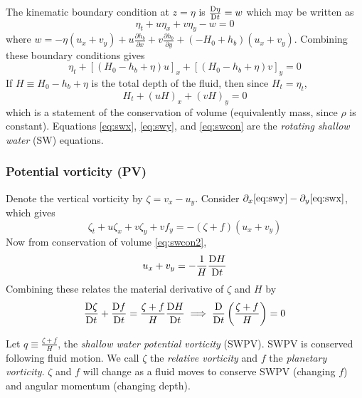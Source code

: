 \documentclass{jknotes}
\begin{document}
The kinematic boundary condition at $z = \eta$ is $\frac{\mathrm{D} \eta}{\mathrm{D}
t} = w$ which may be written as
\begin{equation}
	\eta_t + u \eta_x + v \eta_y - w = 0
\end{equation}
where $w = -\eta(u_x+v_y) + u \frac{\partial h_b}{\partial x} + v
\frac{\partial h_b}{\partial y} + (-H_0 + h_b)(u_x+v_y)$. Combining these
boundary conditions gives
\begin{equation}
	\eta_t + \left[ (H_0-h_b+\eta)u\right]_x + \left[ (H_0-h_b+\eta)v\right]_y
	= 0 \label{eq:swcon}
\end{equation}
If $H \equiv H_0 - h_b + \eta$ is the total depth of the fluid, then since
$H_t = \eta_t$,
\begin{equation}
	H_t + (uH)_x + (vH)_y = 0 \label{eq:swcon2}
\end{equation}
which is a statement of the conservation of volume (equivalently mass, since
$\rho$ is constant). Equations \eqref{eq:swx}, \eqref{eq:swy}, and
\eqref{eq:swcon} are the \emph{rotating shallow water} (SW) equations.

\subsubsection{Potential vorticity (PV)}
Denote the vertical vorticity by $\zeta = v_x - u_y$. Consider $\partial_x
\eqref{eq:swy} - \partial_y \eqref{eq:swx}$, which gives
\begin{equation}
	\zeta_t +u\zeta_x + v\zeta_y + v f_y = -(\zeta + f)(u_x+v_y)
\end{equation}
Now from conservation of volume \eqref{eq:swcon2},
\begin{equation} 
	u_x + v_y = -\frac{1}{H} \frac{\mathrm{D} H}{\mathrm{D} t}
\end{equation}
Combining these relates the material derivative of $\zeta$ and $H$ by
\begin{equation}
	\frac{\mathrm{D} \zeta}{\mathrm{D} t} + \frac{\mathrm{D} f}{\mathrm{D} t}= \frac{\zeta + f}{H} \frac{\mathrm{D} H}{\mathrm{D}
	t} \implies \frac{\mathrm{D}}{\mathrm{D} t}\left(\frac{\zeta + f}{H}\right) = 0
	\label{eq:PV}
\end{equation}

Let $q \equiv \frac{\zeta + f}{H}$, the \emph{shallow water potential
vorticity} (SWPV). SWPV is conserved following fluid motion. We call $\zeta$
the \emph{relative vorticity} and $f$ the \emph{planetary vorticity}. $\zeta$
and $f$ will change as a fluid moves to conserve SWPV (changing $f$) and
angular momentum (changing depth).
\end{document}
